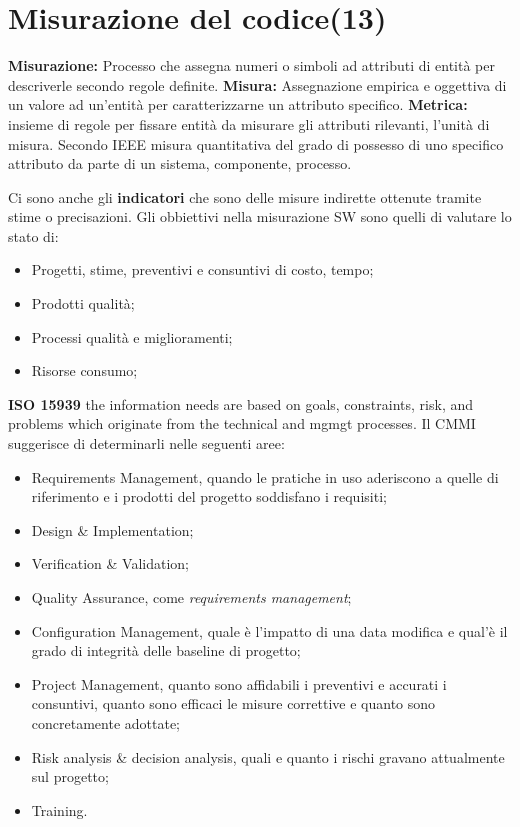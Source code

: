 



\section{Misurazione del codice(13)}

\textbf{Misurazione:} Processo che assegna numeri o simboli ad attributi di entità per descriverle secondo regole definite.
\textbf{Misura:} Assegnazione empirica e oggettiva di un valore ad un'entità per caratterizzarne un attributo specifico.
\textbf{Metrica:} insieme di regole per fissare entità da misurare gli attributi rilevanti, l'unità di misura. Secondo IEEE misura quantitativa del grado di possesso di uno specifico attributo da parte di un sistema, componente, processo.

Ci sono anche gli \textbf{indicatori} che sono delle misure indirette ottenute tramite stime o precisazioni. Gli obbiettivi nella misurazione SW sono quelli di valutare lo stato di:
\begin{itemize}
	\item Progetti, stime, preventivi e consuntivi di costo, tempo;
	\item Prodotti qualità;
	\item Processi qualità e miglioramenti;
	\item Risorse consumo;
\end{itemize}

\textbf{ISO 15939} the information needs are based on goals, constraints, risk, and problems which originate from the technical and mgmgt processes. Il CMMI suggerisce di determinarli nelle seguenti aree:
\begin{itemize}
	\item Requirements Management, quando le pratiche in uso aderiscono a quelle di riferimento e i prodotti del progetto soddisfano i requisiti;
	\item Design \& Implementation;
	\item Verification \& Validation;
	\item Quality Assurance, come \textit{requirements management};
	\item Configuration Management, quale è l'impatto di una data modifica e qual'è il grado di integrità delle baseline di progetto;
	\item Project Management, quanto sono affidabili i preventivi e accurati i consuntivi, quanto sono efficaci le misure correttive e quanto sono concretamente adottate;
	\item Risk analysis \& decision analysis, quali e quanto i rischi gravano attualmente sul progetto;
	\item Training.
\end{itemize}

